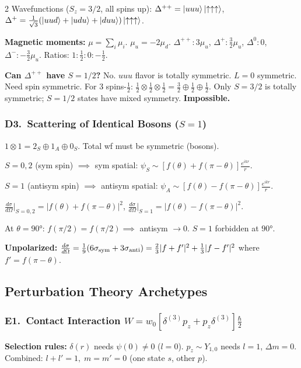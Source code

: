 \documentclass[9pt,a4paper]{article} %
\begin{document}
\begin{multicols}{2}
Wavefunctions ($S_z=3/2$, all spins up):
$\Delta^{++}=\ket{uuu}\ket{\uparrow\uparrow\uparrow}$,\;
$\Delta^+=\frac{1}{\sqrt{3}}(\ket{uud}+\ket{udu}+\ket{duu})\ket{\uparrow\uparrow\uparrow}$.

\textbf{Magnetic moments:} $\mu=\sum_i\mu_i$.\; $\mu_u=-2\mu_d$.
$\Delta^{++}:3\mu_u$,\; $\Delta^+:\frac{3}{2}\mu_u$,\; $\Delta^0:0$,\; $\Delta^-:-\frac{3}{2}\mu_u$.
Ratios: $1:\frac{1}{2}:0:-\frac{1}{2}$.

\textbf{Can $\Delta^{++}$ have $S=1/2$?} No.
$uuu$ flavor is totally symmetric. $L=0$ symmetric. Need spin symmetric.
For 3 spins-$\frac{1}{2}$: $\frac{1}{2}\otimes\frac{1}{2}\otimes\frac{1}{2}=\frac{3}{2}\oplus\frac{1}{2}\oplus\frac{1}{2}$.
Only $S=3/2$ is totally symmetric; $S=1/2$ states have mixed symmetry. \textbf{Impossible.}

\subsubsection{D3.\ Scattering of Identical Bosons ($S=1$)}
$1\otimes 1=2_S\oplus 1_A\oplus 0_S$. Total wf must be symmetric (bosons).

$S=0,2$ (sym spin) $\implies$ sym spatial:
$\psi_S\sim [f(\theta)+f(\pi-\theta)]\frac{e^{ikr}}{r}$.

$S=1$ (antisym spin) $\implies$ antisym spatial:
$\psi_A\sim [f(\theta)-f(\pi-\theta)]\frac{e^{ikr}}{r}$.

$\frac{d\sigma}{d\Omega}\Big|_{S=0,2}=|f(\theta)+f(\pi-\theta)|^2$,\quad
$\frac{d\sigma}{d\Omega}\Big|_{S=1}=|f(\theta)-f(\pi-\theta)|^2$.

At $\theta=90°$: $f(\pi/2)=f(\pi/2)\implies$ antisym $\to 0$. $S=1$ forbidden at $90°$.

\textbf{Unpolarized:}
$\frac{d\sigma}{d\Omega}=\frac{1}{9}(6\sigma_{\rm sym}+3\sigma_{\rm anti})=\frac{2}{3}|f+f'|^2+\frac{1}{3}|f-f'|^2$
where $f'=f(\pi-\theta)$.

\subsection{Perturbation Theory Archetypes}

\subsubsection{E1.\ Contact Interaction $W=w_0[\delta^{(3)}\!p_z+p_z\delta^{(3)}]\frac{\hbar}{2}$}
\textbf{Selection rules:} $\delta(r)$ needs $\psi(0)\ne 0$ ($l=0$). $p_z\sim Y_{1,0}$ needs $l=1$, $\Delta m=0$.
Combined: $\boxed{l+l'=1,\; m=m'=0}$ (one state $s$, other $p$).


\end{multicols}
\end{document}
